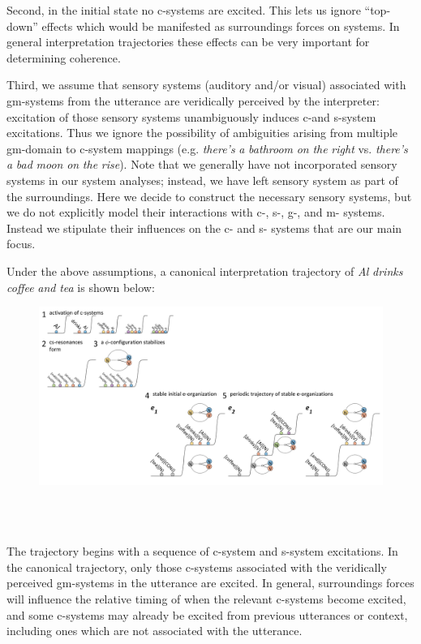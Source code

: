 Second, in the initial state no c-systems are excited. This lets us ignore “top-down” effects which would be manifested as surroundings forces on systems. In general interpretation trajectories these effects can be very important for determining coherence.

Third, we assume that sensory systems (auditory and/or visual) associated with gm-systems from the utterance are veridically perceived by the interpreter: excitation of those sensory systems unambiguously induces c-and s-system excitations. Thus we ignore the possibility of ambiguities arising from multiple gm-domain to c-system mappings (e.g. \textit{there’s} \textit{a} \textit{bathroom} \textit{on} \textit{the} \textit{right} vs. \textit{there’s} \textit{a} \textit{bad} \textit{moon} \textit{on} \textit{the} \textit{rise}). Note that we generally have not incorporated sensory systems in our system analyses; instead, we have left sensory system as part of the surroundings. Here we decide to construct the necessary sensory systems, but we do not explicitly model their interactions with c-, s-, g-, and m- systems. Instead we stipulate their influences on the c- and s- systems that are our main focus.

Under the above assumptions, a canonical interpretation trajectory of \textit{Al} \textit{drinks} \textit{coffee} \textit{and} \textit{tea} is shown below:

  
\begin{figure}
\includegraphics[width=\textwidth]{figures/Tilsen-img121.png}
\caption{\missingcaption}
\label{fig:}
\end{figure}
 

\ea%
    \label{ex:key:1}
    \gll\\
        \\
    \glt
    \z

         The trajectory begins with a sequence of c-system and s-system excitations. In the canonical trajectory, only those c-systems associated with the veridically perceived gm-systems in the utterance are excited. In general, surroundings forces will influence the relative timing of when the relevant c-systems become excited, and some c-systems may already be excited from previous utterances or context, including ones which are not associated with the utterance. 


